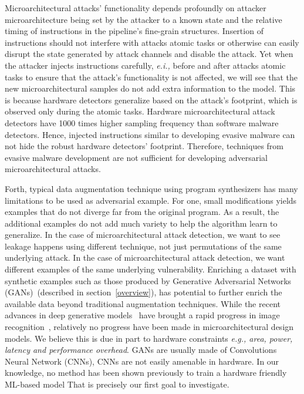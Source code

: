 Microarchitectural attacks' functionality depends profoundly on attacker microarchitecture being set by the attacker to a known state and the relative timing of instructions in the pipeline's fine-grain structures. 
Insertion of instructions should not interfere with attacks atomic tasks or otherwise can easily disrupt the state generated by attack channels and disable the attack. Yet when the attacker injects instructions carefully, {\em e.i.,} before and after attacks atomic tasks to ensure that the attack's functionality is not affected, we will see that the new microarchitectural samples do not add extra information to the model. This is because hardware detectors generalize based on the attack's footprint, which is observed only during the atomic tasks. Hardware microarchitectural attack detectors have 1000 times higher sampling frequency than software malware detectors. Hence, injected instructions similar to developing evasive malware can not hide the robust hardware detectors' footprint. Therefore,  techniques from evasive malware development are not sufficient for developing adversarial microarchitectural attacks. 

Forth,  
typical data augmentation technique using program synthesizers has many limitations to be used as adversarial example. For one, small modifications yields examples that do not diverge far from the original program. As a result, the additional examples do not add much variety to help the algorithm learn to generalize. In the case of microarchitectural attack detection, we want to see leakage happens using different technique, not just permutations of the same underlying attack.
In the case of microarchitectural attack detection, we want different examples of the same underlying vulnerability. Enriching a dataset with synthetic examples such as those produced by Generative Adversarial Networks (GANs)~\cite{goodfellow2014generative}(described in section~\ref{overview}), has potential to further enrich the available data beyond traditional augmentation techniques. While the recent advances in deep generative models~\cite{goodfellow2014generative} have brought a rapid progress in image recognition~\cite{}, relatively no progress have been made in microarchitectural design models. We believe this is due in part to hardware constraints {\em e.g., area, power, latency and performance overhead}. GANs are usually made of Convolutions Neural Network (CNNs), CNNs are not easily amenable in hardware. In our knowledge, no method has been shown previously to train a hardware friendly ML-based model  That is precisely our first goal to investigate. 

